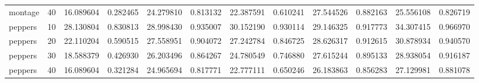 \begin{tabular}{lrrrrrrrrrrr}
     montage &     40 &   16.089604 &    0.282465 &             24.279810 &              0.813132 &        22.387591 &         0.610241 &         27.544526 &          0.882163 &          25.556108 &           0.826719 \\
     peppers &     10 &   28.130804 &    0.830813 &             28.998430 &              0.935007 &        30.152190 &         0.930114 &         29.146325 &          0.917773 &          34.307415 &           0.966970 \\
     peppers &     20 &   22.110204 &    0.590515 &             27.558951 &              0.904072 &        27.242784 &         0.846725 &         28.626317 &          0.912615 &          30.878934 &           0.940570 \\
     peppers &     30 &   18.588379 &    0.426930 &             26.203496 &              0.864267 &        24.780549 &         0.746880 &         27.615244 &          0.895133 &          28.938054 &           0.916187 \\
     peppers &     40 &   16.089604 &    0.321284 &             24.965694 &              0.817771 &        22.777111 &         0.650246 &         26.183863 &          0.856283 &          27.129981 &           0.881078 \\
\bottomrule
\end{tabular}
